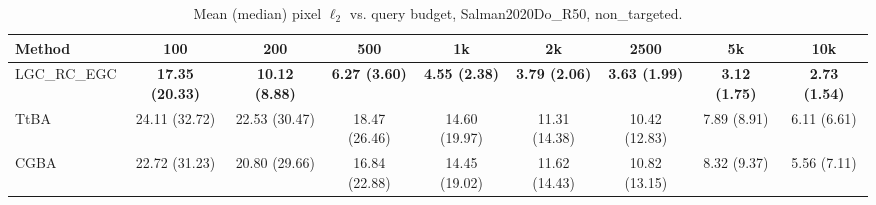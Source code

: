 \begin{table}[t]
\centering\footnotesize
\caption{Mean (median) pixel $\ell_2$ vs. query budget, Salman2020Do\_R50, non\_targeted.}
\begin{tabular}{lcccccccc}
\toprule
Method & 100 & 200 & 500 & 1k & 2k & 2500 & 5k & 10k \\
\midrule
LGC\_RC\_EGC & \textbf{17.35 (20.33)} & \textbf{10.12 (8.88)} & \textbf{6.27 (3.60)} & \textbf{4.55 (2.38)} & \textbf{3.79 (2.06)} & \textbf{3.63 (1.99)} & \textbf{3.12 (1.75)} & \textbf{2.73 (1.54)} \\
TtBA & 24.11 (32.72) & 22.53 (30.47) & 18.47 (26.46) & 14.60 (19.97) & 11.31 (14.38) & 10.42 (12.83) & 7.89 (8.91) & 6.11 (6.61) \\
CGBA & 22.72 (31.23) & 20.80 (29.66) & 16.84 (22.88) & 14.45 (19.02) & 11.62 (14.43) & 10.82 (13.15) & 8.32 (9.37) & 5.56 (7.11) \\
\bottomrule
\end{tabular}
\end{table}
